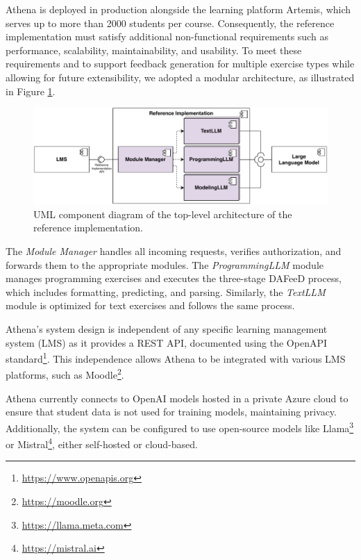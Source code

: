 \documentclass[manuscript,screen,review]{acmart}
\begin{document}
Athena is deployed in production alongside the learning platform Artemis, which serves up to more than 2000 students per course.
Consequently, the reference implementation must satisfy additional non-functional requirements such as performance, scalability, maintainability, and usability.
To meet these requirements and to support feedback generation for multiple exercise types while allowing for future extensibility, we adopted a modular architecture, as illustrated in Figure \ref{fig:Athena-architecture}.

\begin{figure}[htbp]
  \centering
  \includegraphics[width=0.8\linewidth]{figures/Athena-Architecture.pdf}
  \caption{UML component diagram of the top-level architecture of the reference implementation.}
  \label{fig:Athena-architecture}
\end{figure}

The \textit{Module Manager} handles all incoming requests, verifies authorization, and forwards them to the appropriate modules.
The \textit{ProgrammingLLM} module manages programming exercises and executes the three-stage DAFeeD process, which includes formatting, predicting, and parsing. 
Similarly, the \textit{TextLLM} module is optimized for text exercises and follows the same process.

Athena's system design is independent of any specific learning management system (LMS) as it provides a REST API, documented using the OpenAPI standard\footnote{\url{https://www.openapis.org}}.
This independence allows Athena to be integrated with various LMS platforms, such as Moodle\footnote{\url{https://moodle.org}}.

Athena currently connects to OpenAI models hosted in a private Azure cloud to ensure that student data is not used for training models, maintaining privacy.
Additionally, the system can be configured to use open-source models like Llama\footnote{\url{https://llama.meta.com}} or Mistral\footnote{\url{https://mistral.ai}}, either self-hosted or cloud-based.
\end{document}
